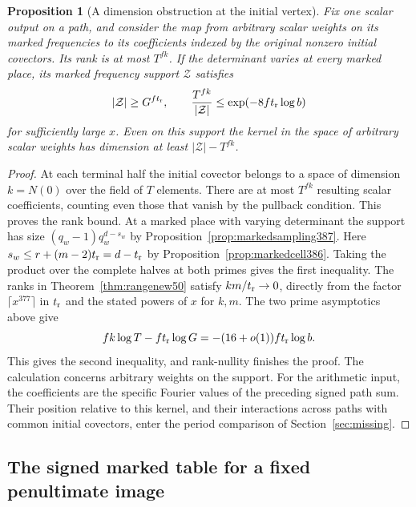 \documentclass[a4paper,11pt]{article}
\newtheorem{proposition}{Proposition}[section]
\theoremstyle{definition}
\theoremstyle{remark}
\numberwithin{equation}{section}
\begin{document}
\begin{proposition}[A dimension obstruction at the initial vertex]
\label{prop:initialrank392}
Fix one scalar output on a path, and consider the map from
arbitrary scalar weights on its marked frequencies to its
coefficients indexed by the original nonzero initial covectors.
Its rank is at most \(T^{fk}\). If the determinant varies at
every marked place, its marked frequency support \(\mathcal Z\)
satisfies
\[
         |\mathcal Z|\ge G^{f t_{\rm r}},\qquad
    \frac{T^{fk}}{|\mathcal Z|}
            \le \exp(-8f t_{\rm r}\log b)
\]
for sufficiently large \(x\). Even on this support the kernel
in the space of arbitrary scalar weights has dimension at
least \(|\mathcal Z|-T^{fk}\).
\end{proposition}
\begin{proof}
At each terminal half the initial covector belongs to a
space of dimension \(k=N(0)\) over the field of \(T\)
elements. There are at most \(T^{fk}\) resulting scalar
coefficients, counting even those that vanish by the
pullback condition. This proves the rank bound. At a marked
place with varying determinant the support has size
\((q_w-1)q_w^{d-s_w}\) by Proposition~\ref{prop:markedsampling387}.
Here \(s_w\le r+(m-2)t_{\rm r}=d-t_{\rm r}\) by
Proposition~\ref{prop:markedcell386}. Taking the product
over the complete halves at both primes gives the first
inequality. The ranks in Theorem~\ref{thm:rangenew50}
satisfy \(km/t_{\rm r}\to0\), directly from the factor
\(\lceil x^{377}\rceil\) in \(t_{\rm r}\) and the stated
powers of \(x\) for \(k,m\). The two prime asymptotics above
give
\[
 fk\log T-ft_{\rm r}\log G
                 =-(16+o(1))ft_{\rm r}\log b .
\]
This gives the second inequality, and rank-nullity finishes
the proof. The calculation concerns arbitrary weights on the
support. For the arithmetic input, the coefficients are the
specific Fourier values of the preceding signed path sum.
Their position relative to this kernel, and their interactions
across paths with common initial covectors, enter the period
comparison of Section~\ref{sec:missing}.
\end{proof}


\subsection{The signed marked table for a fixed penultimate image}
\label{sec:markedimage393}
\end{document}
